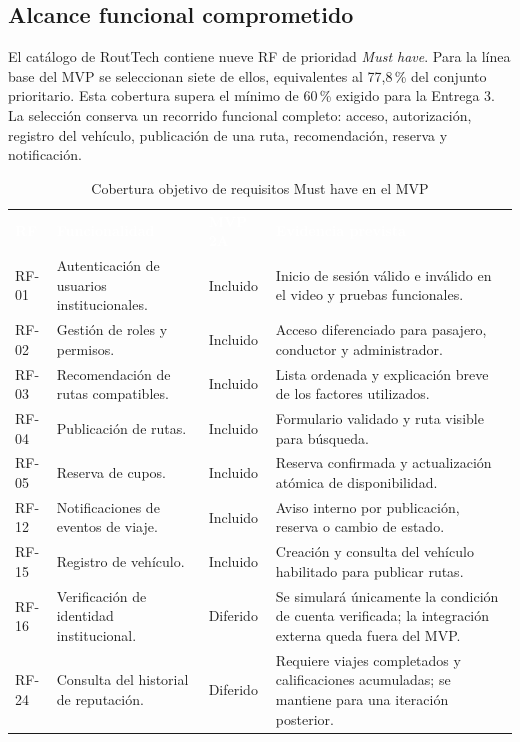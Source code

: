 \documentclass[12pt,a4paper]{article}
\begin{document}
\subsection{Alcance funcional comprometido}

El catálogo de RoutTech contiene nueve RF de prioridad \emph{Must have}. Para la línea base del MVP se seleccionan siete de ellos, equivalentes al 77,8\,\% del conjunto prioritario. Esta cobertura supera el mínimo de 60\,\% exigido para la Entrega 3. La selección conserva un recorrido funcional completo: acceso, autorización, registro del vehículo, publicación de una ruta, recomendación, reserva y notificación.

\begin{table}[H]
\centering
\caption{Cobertura objetivo de requisitos Must have en el MVP}
\label{tab:cobertura-mvp-must}
\small
{}
\begin{tabularx}{\textwidth}{C{1.25cm} Y C{2.15cm} L{3.25cm}}
\textcolor{white}{\textbf{RF}} &
\textcolor{white}{\textbf{Funcionalidad}} &
\textcolor{white}{\textbf{MVP 2A}} &
\textcolor{white}{\textbf{Evidencia prevista}}\\
RF-01 & Autenticación de usuarios institucionales. & Incluido & Inicio de sesión válido e inválido en el video y pruebas funcionales.\\
RF-02 & Gestión de roles y permisos. & Incluido & Acceso diferenciado para pasajero, conductor y administrador.\\
RF-03 & Recomendación de rutas compatibles. & Incluido & Lista ordenada y explicación breve de los factores utilizados.\\
RF-04 & Publicación de rutas. & Incluido & Formulario validado y ruta visible para búsqueda.\\
RF-05 & Reserva de cupos. & Incluido & Reserva confirmada y actualización atómica de disponibilidad.\\
RF-12 & Notificaciones de eventos de viaje. & Incluido & Aviso interno por publicación, reserva o cambio de estado.\\
RF-15 & Registro de vehículo. & Incluido & Creación y consulta del vehículo habilitado para publicar rutas.\\
RF-16 & Verificación de identidad institucional. & Diferido & Se simulará únicamente la condición de cuenta verificada; la integración externa queda fuera del MVP.\\
RF-24 & Consulta del historial de reputación. & Diferido & Requiere viajes completados y calificaciones acumuladas; se mantiene para una iteración posterior.\\
\end{tabularx}
\end{table}
\end{document}
